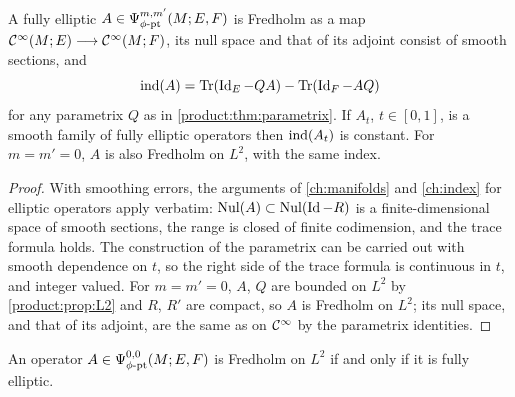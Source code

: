\begin{corollary}\label{product:cor:fredholm}
A fully elliptic $A\in\Psi^{m,m'}_{\phi\text{-}\mathrm{pt}}(M;E,F)$ is Fredholm as a map
$\mathcal{C}^\infty(M;E)\longrightarrow\mathcal{C}^\infty(M;F)$, its null space and that of its adjoint consist of
smooth sections, and
\begin{equation*}
\operatorname{ind}(A)=\operatorname{Tr}(\operatorname{Id}_E-QA)-\operatorname{Tr}(\operatorname{Id}_F-AQ)
\end{equation*}
for any parametrix $Q$ as in \cref{product:thm:parametrix}. If $A_t$, $t\in[0,1]$, is
a smooth family of fully elliptic operators then $\operatorname{ind}(A_t)$ is constant. For
$m=m'=0$, $A$ is also Fredholm on $L^2$, with the same index.
\end{corollary}

\begin{proof}
With smoothing errors, the arguments of \cref{ch:manifolds} and \cref{ch:index}
for elliptic operators apply verbatim: $\operatorname{Nul}(A)\subset\operatorname{Nul}(\operatorname{Id}-R)$ is a
finite-dimensional space of smooth sections, the range is closed of finite
codimension, and the trace formula holds. The construction of the parametrix can
be carried out with smooth dependence on $t$, so the right side of the trace
formula is continuous in $t$, and integer valued. For $m=m'=0$, $A$, $Q$ are bounded
on $L^2$ by \cref{product:prop:L2} and $R$, $R'$ are compact, so $A$ is Fredholm on
$L^2$; its null space, and that of its adjoint, are the same as on $\mathcal{C}^\infty$ by the
parametrix identities.
\end{proof}

\begin{proposition}\label{product:prop:fredholm-iff}
An operator $A\in\Psi^{0,0}_{\phi\text{-}\mathrm{pt}}(M;E,F)$ is Fredholm on $L^2$ if and only if it is fully
elliptic.
\end{proposition}

